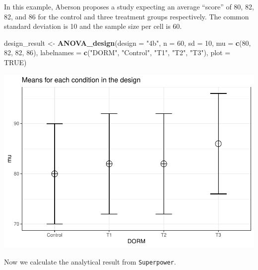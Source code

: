 \documentclass[]{book}
\newenvironment{Shaded}{\begin{snugshade}}{\end{snugshade}}
\newcommand{\DataTypeTok}[1]{\textcolor[rgb]{0.13,0.29,0.53}{#1}}
\newcommand{\DecValTok}[1]{\textcolor[rgb]{0.00,0.00,0.81}{#1}}
\newcommand{\KeywordTok}[1]{\textcolor[rgb]{0.13,0.29,0.53}{\textbf{#1}}}
\newcommand{\NormalTok}[1]{#1}
\newcommand{\OperatorTok}[1]{\textcolor[rgb]{0.81,0.36,0.00}{\textbf{#1}}}
\newcommand{\OtherTok}[1]{\textcolor[rgb]{0.56,0.35,0.01}{#1}}
\newcommand{\StringTok}[1]{\textcolor[rgb]{0.31,0.60,0.02}{#1}}
\begin{document}
In this example, Aberson proposes a study expecting an average ``score'' of 80, 82, 82, and 86 for the control and three treatment groups respectively. The common standard deviation is 10 and the sample size per cell is 60.

\begin{Shaded}
\begin{Highlighting}[]
\NormalTok{design_result <-}\StringTok{ }\KeywordTok{ANOVA_design}\NormalTok{(}\DataTypeTok{design =} \StringTok{"4b"}\NormalTok{,}
                              \DataTypeTok{n =} \DecValTok{60}\NormalTok{,}
                              \DataTypeTok{sd =} \DecValTok{10}\NormalTok{,}
                              \DataTypeTok{mu =} \KeywordTok{c}\NormalTok{(}\DecValTok{80}\NormalTok{, }\DecValTok{82}\NormalTok{, }\DecValTok{82}\NormalTok{, }\DecValTok{86}\NormalTok{),}
                              \DataTypeTok{labelnames =} \KeywordTok{c}\NormalTok{(}\StringTok{"DORM"}\NormalTok{,}
                              \StringTok{"Control"}\NormalTok{,}
                              \StringTok{"T1"}\NormalTok{,}
                              \StringTok{"T2"}\NormalTok{,}
                              \StringTok{"T3"}\NormalTok{),}
                              \DataTypeTok{plot =} \OtherTok{TRUE}\NormalTok{)}
\end{Highlighting}
\end{Shaded}

\includegraphics{SuperpowerValidation_files/figure-latex/aberson_appendix-1.pdf}

Now we calculate the analytical result from \texttt{Superpower}.

\begin{Shaded}
\end{Shaded}
\end{document}
